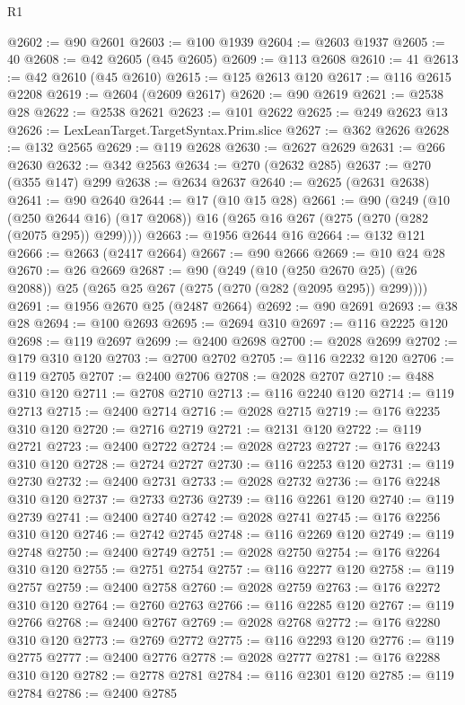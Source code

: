 \begin{lexlean}{R1}
\begin{coremodule}
@2602 := @90 @2601
@2603 := @100 @1939
@2604 := @2603 @1937
@2605 := 40
@2608 := @42 @2605 (@45 @2605)
@2609 := @113 @2608
@2610 := 41
@2613 := @42 @2610 (@45 @2610)
@2615 := @125 @2613 @120
@2617 := @116 @2615 @2208
@2619 := @2604 (@2609 @2617)
@2620 := @90 @2619
@2621 := @2538 @28
@2622 := @2538 @2621
@2623 := @101 @2622
@2625 := @249 @2623 @13
@2626 := LexLeanTarget.TargetSyntax.Prim.slice
@2627 := @362 @2626
@2628 := @132 @2565
@2629 := @119 @2628
@2630 := @2627 @2629
@2631 := @266 @2630
@2632 := @342 @2563
@2634 := @270 (@2632 @285)
@2637 := @270 (@355 @147) @299
@2638 := @2634 @2637
@2640 := @2625 (@2631 @2638)
@2641 := @90 @2640
@2644 := @17 (@10 @15 @28)
@2661 := @90
    (@249
      (@10 (@250 @2644 @16) (@17 @2068))
      @16
      (@265 @16 @267 (@275 (@270 (@282 (@2075 @295)) @299))))
@2663 := @1956 @2644 @16
@2664 := @132 @121
@2666 := @2663 (@2417 @2664)
@2667 := @90 @2666
@2669 := @10 @24 @28
@2670 := @26 @2669
@2687 := @90
    (@249
      (@10 (@250 @2670 @25) (@26 @2088))
      @25
      (@265 @25 @267 (@275 (@270 (@282 (@2095 @295)) @299))))
@2691 := @1956 @2670 @25 (@2487 @2664)
@2692 := @90 @2691
@2693 := @38 @28
@2694 := @100 @2693
@2695 := @2694 @310
@2697 := @116 @2225 @120
@2698 := @119 @2697
@2699 := @2400 @2698
@2700 := @2028 @2699
@2702 := @179 @310 @120
@2703 := @2700 @2702
@2705 := @116 @2232 @120
@2706 := @119 @2705
@2707 := @2400 @2706
@2708 := @2028 @2707
@2710 := @488 @310 @120
@2711 := @2708 @2710
@2713 := @116 @2240 @120
@2714 := @119 @2713
@2715 := @2400 @2714
@2716 := @2028 @2715
@2719 := @176 @2235 @310 @120
@2720 := @2716 @2719
@2721 := @2131 @120
@2722 := @119 @2721
@2723 := @2400 @2722
@2724 := @2028 @2723
@2727 := @176 @2243 @310 @120
@2728 := @2724 @2727
@2730 := @116 @2253 @120
@2731 := @119 @2730
@2732 := @2400 @2731
@2733 := @2028 @2732
@2736 := @176 @2248 @310 @120
@2737 := @2733 @2736
@2739 := @116 @2261 @120
@2740 := @119 @2739
@2741 := @2400 @2740
@2742 := @2028 @2741
@2745 := @176 @2256 @310 @120
@2746 := @2742 @2745
@2748 := @116 @2269 @120
@2749 := @119 @2748
@2750 := @2400 @2749
@2751 := @2028 @2750
@2754 := @176 @2264 @310 @120
@2755 := @2751 @2754
@2757 := @116 @2277 @120
@2758 := @119 @2757
@2759 := @2400 @2758
@2760 := @2028 @2759
@2763 := @176 @2272 @310 @120
@2764 := @2760 @2763
@2766 := @116 @2285 @120
@2767 := @119 @2766
@2768 := @2400 @2767
@2769 := @2028 @2768
@2772 := @176 @2280 @310 @120
@2773 := @2769 @2772
@2775 := @116 @2293 @120
@2776 := @119 @2775
@2777 := @2400 @2776
@2778 := @2028 @2777
@2781 := @176 @2288 @310 @120
@2782 := @2778 @2781
@2784 := @116 @2301 @120
@2785 := @119 @2784
@2786 := @2400 @2785

\end{coremodule}
\end{lexlean}
